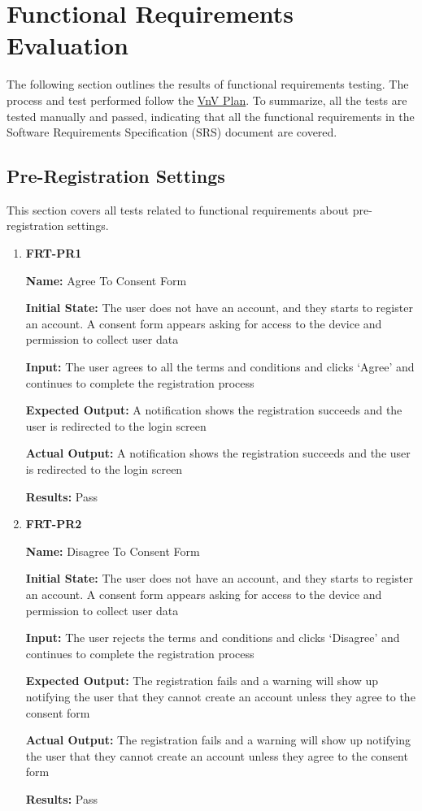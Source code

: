 \documentclass[12pt, titlepage]{article}
\begin{document}
\section{Functional Requirements Evaluation}
The following section outlines the results of functional requirements testing. The process and test performed follow the \href{https://github.com/beatlepie/4G06CapstoneProjectTeam2/blob/main/docs/VnVPlan/VnVPlan.pdf}{VnV Plan}. To summarize, all the tests are tested manually and passed, indicating that all the functional requirements in the Software Requirements Specification (SRS) document are covered.

\subsection{Pre-Registration Settings}
This section covers all tests related to functional requirements about pre-registration settings.
\begin{enumerate}
\item \textbf{FRT-PR1}

\textbf{Name:} Agree To Consent Form

\textbf{Initial State:} The user does not have an account, and they starts to register an account. A consent form appears asking for access to the device and permission to collect user data

\textbf{Input:} The user agrees to all the terms and conditions and clicks `Agree' and continues to complete the registration process
					
\textbf{Expected Output:} A notification shows the registration succeeds and the user is redirected to the login screen

\textbf{Actual Output:} A notification shows the registration succeeds and the user is redirected to the login screen

\textbf{Results:} Pass

\item \textbf{FRT-PR2}

\textbf{Name:} Disagree To Consent Form

\textbf{Initial State:} The user does not have an account, and they starts to register an account. A consent form appears asking for access to the device and permission to collect user data
					
\textbf{Input:} The user rejects the terms and conditions and clicks `Disagree' and continues to complete the registration process
					
\textbf{Expected Output:} The registration fails and a warning will show up notifying the user that they cannot create an account unless they agree to the consent form

\textbf{Actual Output:} The registration fails and a warning will show up notifying the user that they cannot create an account unless they agree to the consent form

\textbf{Results:} Pass
\end{enumerate}
\end{document}
